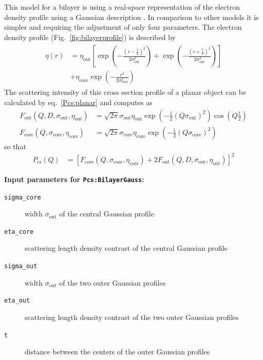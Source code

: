 This model for a bilayer is using a real-space representation of the electron density profile
using a Gaussian description \cite{Pabst2000,Pabst2003}. In comparison to other models it
is simpler and requiring the adjustment of only four parameters. The electron density profile
(Fig.\ \ref{fig:bilayerprofile}) is described by
\begin{align}
\begin{split}
\eta(r) &=  \eta_\textrm{out} \left[ \exp\left(-\frac{\left(r-\frac{t}{2}\right)^2}{2\sigma_\textrm{out}^2}\right) +
   \exp\left(-\frac{\left(r+\frac{t}{2}\right)^2}{2\sigma_\textrm{out}^2}\right) \right] \\
          &+ \eta_\textrm{core} \exp\left(-\frac{r^2}{2\sigma_\textrm{core}^2}\right)
          \label{eq:BiLayerGaussianProfile}
\end{split}
\end{align}
The scattering intensity of this cross section profile of a planar object can be calculated by eq.\ \ref{Pcs:planar}
and computes as
\begin{align}
   F_\text{out}\left(Q,D,\sigma_\textrm{out},\eta_\textrm{out}\right)  &= \sqrt{2\pi}\sigma_\textrm{out}  \eta_\textrm{out}  \exp\left(-\frac{1}{2}\left(Q\sigma_\textrm{out} \right)^2\right) \cos\left(Q\frac{t}{2}\right) \\
   F_\text{core}\left(Q,\sigma_\textrm{core},\eta_\textrm{core}\right) &= \sqrt{2\pi}\sigma_\textrm{core} \eta_\textrm{core} \exp\left(-\frac{1}{2}\left(Q\sigma_\textrm{core}\right)^2\right)
\end{align}
so that
\begin{align}
  P_\text{cs}\left(Q\right)   &=\left[F_\text{core}\left(Q,\sigma_\textrm{core}, \eta_\textrm{core}\right)
                                   +2 F_\text{out} \left(Q,D,\sigma_\textrm{out},\eta_\textrm{out} \right)\right]^2
  \label{eq:PcsBilayer}
\end{align}

\noindent
\textbf{Input parameters for \texttt{Pcs:BilayerGauss}:}
\begin{description}
    \item[\texttt{sigma\_core}] width $\sigma_\mathrm{out}$ of the central Gaussian profile
    \item[\texttt{eta\_core}] scattering length density contrast of the central Gaussian profile
    \item[\texttt{sigma\_out}] width $\sigma_\mathrm{out}$ of the two outer Gaussian profiles
    \item[\texttt{eta\_out}] scattering length density contrast of the two outer Gaussian profiles
    \item[\texttt{t}] distance between the centers of the outer Gaussian profiles
\end{description}

